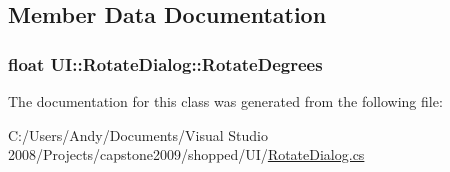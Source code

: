 \subsection{Member Data Documentation}
\hypertarget{class_u_i_1_1_rotate_dialog_a6ea5257142dfe12543d77ab37bdf0edc}{
\subsubsection[{RotateDegrees}]{\setlength{\rightskip}{0pt plus 5cm}float {\bf UI::RotateDialog::RotateDegrees}}}
\label{class_u_i_1_1_rotate_dialog_a6ea5257142dfe12543d77ab37bdf0edc}


The documentation for this class was generated from the following file:\begin{DoxyCompactItemize}
\item 
C:/Users/Andy/Documents/Visual Studio 2008/Projects/capstone2009/shopped/UI/\hyperlink{_rotate_dialog_8cs}{RotateDialog.cs}\end{DoxyCompactItemize}
